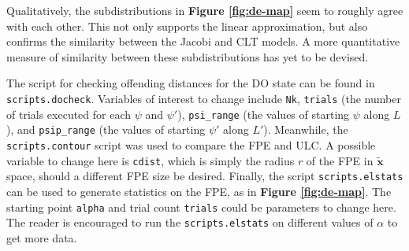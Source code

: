 \documentclass[letterpaper,12pt]{article}
\numberwithin{table}{section}
\numberwithin{figure}{section}
\numberwithin{equation}{section}
\newcommand{\reffig}[1]{\textbf{Figure \ref{#1}}}
\begin{document}
\begin{flushleft}
\begin{figure}[!h]
    \end{figure}

    Qualitatively, the subdistributions in \reffig{fig:de-map} seem to roughly agree with each other. This not only supports the linear approximation, but also confirms the similarity between the Jacobi and CLT models. A more quantitative measure of similarity between these subdistributions has yet to be devised.

    The script for checking offending distances for the DO state can be found in \texttt{scripts.docheck}. Variables of interest to change include \texttt{Nk}, \texttt{trials} (the number of trials executed for each $\psi$ and $\psi'$), \texttt{psi\_range} (the values of starting $\psi$ along $L$), and \texttt{psip\_range} (the values of starting $\psi'$ along $L'$). Meanwhile, the \texttt{scripts.contour} script was used to compare the FPE and ULC. A possible variable to change here is \texttt{cdist}, which is simply the radius $r$ of the FPE in $\tilde{\mathbf{x}}$ space, should a different FPE size be desired. Finally, the script \texttt{scripts.elstats} can be used to generate statistics on the FPE, as in \reffig{fig:de-map}. The starting point \texttt{alpha} and trial count \texttt{trials} could be parameters to change here. The reader is encouraged to run the \texttt{scripts.elstats} on different values of $\alpha$ to get more data.

    \pagebreak


\end{flushleft}
\end{document}

